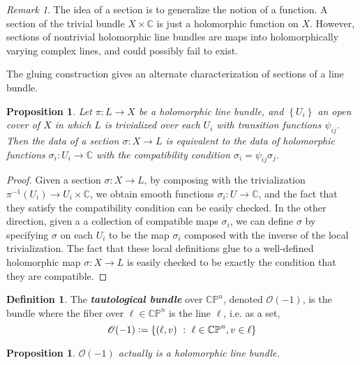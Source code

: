 \documentclass[psamsfonts, 12pt]{amsart}
\newtheorem{prop}[thm]{Proposition}
\theoremstyle{definition}
\newtheorem{defn}[thm]{Definition}
\theoremstyle{remark}
\newtheorem*{rem*}{Remark}
\renewcommand{\O}{\mathscr{O}}
\newcommand{\ib}[1]{\textbf{\textit{#1}}}
\newcommand{\C}{\mathbb{C}}
\newcommand{\CP}{\mathbb{CP}}
\newcommand{\inv}{^{-1}}
\newcommand{\set}[1]{\left\lbrace #1 \right\rbrace}
\newcommand{\defeq}{\vcentcolon=}
\begin{document}
%
\begin{rem*}
The idea of a section is to generalize the notion of a function. A section
of the trivial bundle $X \times \C$ is just a holomorphic function on $X$. However,
sections of nontrivial holomorphic line bundles are maps into holomorphically
varying complex lines, and could possibly fail to exist.
\end{rem*}
%
The gluing construction gives an alternate characterization of sections of a line bundle.
%
\begin{prop}
Let $\pi : L \to X$ be a holomorphic line bundle, and $\set{U_i}$ an open cover of
$X$ in which $L$ is trivialized over each $U_i$ with transition functions $\psi_{ij}$.
Then the data of a section $\sigma : X \to L$ is equivalent to the data
of holomorphic functions $\sigma_i : U_i \to \C$ with the compatibility condition
$\sigma_i = \psi_{ij}\sigma_j$.
\end{prop}
%
\begin{proof}
Given a section $\sigma : X \to L$, by composing with the trivialization
$\pi\inv(U_i) \to U_i \times \C$, we obtain smooth functions $\sigma_i : U \to \C$,
and the fact that they satisfy the compatibility condition can be easily checked.
In the other direction, given a a collection of compatible maps $\sigma_i$,
we can define $\sigma$ by specifying $\sigma$ on each $U_i$ to be
the map $\sigma_i$ composed with the inverse of the local trivialization.
The fact that these local definitions glue to a well-defined holomorphic map
$\sigma : X \to L$ is easily checked to be exactly the condition that they are
compatible.
\end{proof}
%
\begin{defn}
The \ib{tautological bundle} over $\CP^n$, denoted $\O(-1)$, is the bundle
where the fiber over $\ell \in \CP^n$ is the line $\ell$, i.e. as a set,
\[
\O(-1) \defeq \set{(\ell, v) ~:~ \ell \in \CP^n, v \in \ell}
\]
\end{defn}
%
\begin{prop}
$\O(-1)$ actually is a holomorphic line bundle.
\end{prop}
%
\end{document}
